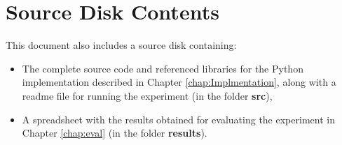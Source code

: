 \chapter{Source Disk Contents}

This document also includes a source disk containing:

\begin{itemize}
	\item The complete source code and referenced libraries for the Python implementation described in Chapter \ref{chap:Implmentation}, along with a readme file for running the experiment (in the folder \textbf{src}),
	\item A spreadsheet with the results obtained for evaluating the experiment in Chapter \ref{chap:eval} (in the folder \textbf{results}). 
\end{itemize}
